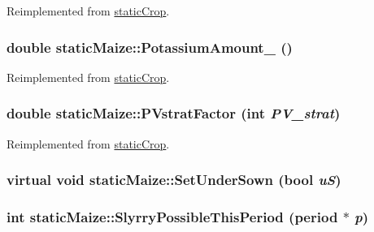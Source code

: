 Reimplemented from \hyperlink{classstatic_crop_abaa5c59d4074d47dedc79172f8326e08}{staticCrop}.\hypertarget{classstatic_maize_a3b0031d7c36e7f11f4ca81ece845c63c}{
\subsubsection[{PotassiumAmount\_\-}]{\setlength{\rightskip}{0pt plus 5cm}double staticMaize::PotassiumAmount\_\- ()}}
\label{classstatic_maize_a3b0031d7c36e7f11f4ca81ece845c63c}


Reimplemented from \hyperlink{classstatic_crop_a41fee98d728c7670e6acb504a9b3459d}{staticCrop}.\hypertarget{classstatic_maize_a8a64240f6fed1b843e9d9521dad59231}{
\subsubsection[{PVstratFactor}]{\setlength{\rightskip}{0pt plus 5cm}double staticMaize::PVstratFactor (int {\em PV\_\-strat})}}
\label{classstatic_maize_a8a64240f6fed1b843e9d9521dad59231}


Reimplemented from \hyperlink{classstatic_crop_ae4f07498c1616eab212386faf352d348}{staticCrop}.\hypertarget{classstatic_maize_a63e7d361f819155d45d3df7a67a7813d}{
\subsubsection[{SetUnderSown}]{\setlength{\rightskip}{0pt plus 5cm}virtual void staticMaize::SetUnderSown (bool {\em uS})}}
\label{classstatic_maize_a63e7d361f819155d45d3df7a67a7813d}
\hypertarget{classstatic_maize_ac7221669f33010383e88c2cc74d02c57}{
\subsubsection[{SlyrryPossibleThisPeriod}]{\setlength{\rightskip}{0pt plus 5cm}int staticMaize::SlyrryPossibleThisPeriod ({\bf period} $\ast$ {\em p})}}
\label{classstatic_maize_ac7221669f33010383e88c2cc74d02c57}


